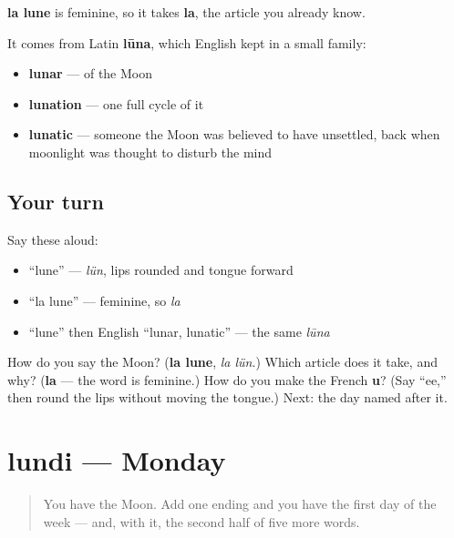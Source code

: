 \begin{cousinweb}
\textbf{la lune} is feminine, so it takes \textbf{la}, the article you already know.

It comes from Latin \textbf{lūna}, which English kept in a small family:

\begin{itemize}
\raggedright
  \item \textbf{lunar} — of the Moon
  \item \textbf{lunation} — one full cycle of it
  \item \textbf{lunatic} — someone the Moon was believed to have unsettled, back when moonlight was thought to disturb the mind
\end{itemize}
\end{cousinweb}

\subsection*{Your turn}
Say these aloud:

\begin{itemize}
\raggedright
  \item \textquotedblleft{}lune\textquotedblright{} — \emph{lün}, lips rounded and tongue forward
  \item \textquotedblleft{}la lune\textquotedblright{} — feminine, so \emph{la}
  \item \textquotedblleft{}lune\textquotedblright{} then English \textquotedblleft{}lunar, lunatic\textquotedblright{} — the same \emph{lūna}
\end{itemize}

\begin{tcolorbox}[breakable,colback=teal!4,colframe=teal!35!black,title={Before you move on}]
How do you say the Moon? (\textbf{la lune}, \emph{la lün}.) Which article does it take, and why? (\textbf{la} — the word is feminine.) How do you make the French \textbf{u}? (Say \textquotedblleft{}ee,\textquotedblright{} then round the lips without moving the tongue.) Next: the day named after it.
\end{tcolorbox}
\section[lundi]{lundi — Monday}

\label{lesson:FR-C07-lundi}



\begin{quote}
You have the Moon. Add one ending and you have the first day of the week — and, with it, the second half of five more words.
\end{quote}

